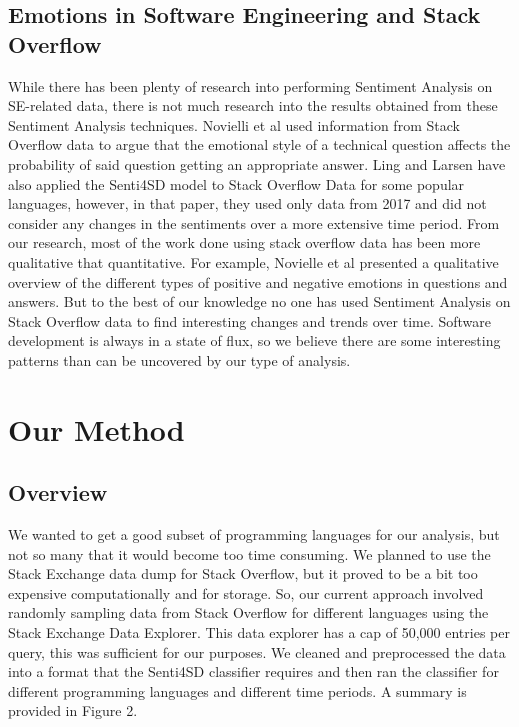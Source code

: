 \documentclass[conference]{IEEEtran}
\begin{document}
\subsection{Emotions in Software Engineering and Stack Overflow}
While there has been plenty of research into performing Sentiment Analysis on SE-related data, there is not much research into the results obtained from these Sentiment Analysis techniques. Novielli et al\cite{b33} used information from Stack Overflow data to argue that the emotional style of a technical question affects the probability of said question getting an appropriate answer.  Ling and Larsen\cite{b11} have also applied the Senti4SD model to Stack Overflow Data for some popular languages, however, in that paper, they used only data from 2017 and did not consider any changes in the sentiments over a more extensive time period. From our research, most of the work done using stack overflow data has been more qualitative that quantitative. For example, Novielle et al \cite{b34} presented a qualitative overview of the different types of positive and negative emotions in questions and answers. But to the best of our knowledge no one has used Sentiment Analysis on Stack Overflow data to find interesting changes and trends over time. Software development is always in a state of flux, so we believe there are some interesting patterns than can be uncovered by our type of analysis.\\

\section{Our Method}
 
\subsection{Overview}
We wanted to get a good subset of programming languages for our analysis, but not so many that it would become too time consuming. We planned to use the Stack Exchange data dump for Stack Overflow, but it proved to be a bit too expensive computationally and for storage. So, our current approach involved randomly sampling data from Stack Overflow for different languages using the Stack Exchange Data Explorer\cite{b28}. This data explorer has a cap of 50,000 entries per query, this was sufficient for our purposes. We cleaned and preprocessed the data into a format that the Senti4SD classifier requires and then ran the classifier for different programming languages and different time periods. A summary is provided in Figure 2.\\
\end{document}

